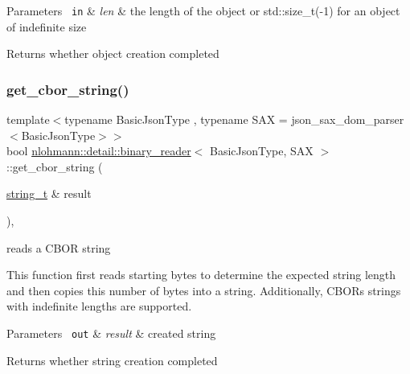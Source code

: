 \begin{DoxyParams}[1]{Parameters}
\mbox{\texttt{ in}}  & {\em len} & the length of the object or std\+::size\+\_\+t(-\/1) for an object of indefinite size \\
\hline
\end{DoxyParams}
\begin{DoxyReturn}{Returns}
whether object creation completed 
\end{DoxyReturn}
\mbox{\label{classnlohmann_1_1detail_1_1binary__reader_acca76844160000e1d8215cb5c7afbba1}} 
\subsubsection{\texorpdfstring{get\_cbor\_string()}{get\_cbor\_string()}}
{\footnotesize\ttfamily template$<$typename Basic\+Json\+Type , typename S\+AX  = json\+\_\+sax\+\_\+dom\+\_\+parser$<$\+Basic\+Json\+Type$>$$>$ \\
bool \mbox{\hyperlink{classnlohmann_1_1detail_1_1binary__reader}{nlohmann\+::detail\+::binary\+\_\+reader}}$<$ Basic\+Json\+Type, S\+AX $>$\+::get\+\_\+cbor\+\_\+string (\begin{DoxyParamCaption}\item[{\mbox{\hyperlink{classnlohmann_1_1detail_1_1binary__reader_aa0b9729917ca7ee6ed01e3792341316e}{string\+\_\+t}} \&}]{result }\end{DoxyParamCaption})\hspace{0.3cm}{\ttfamily [inline]}, {\ttfamily [private]}}



reads a C\+B\+OR string 

This function first reads starting bytes to determine the expected string length and then copies this number of bytes into a string. Additionally, C\+B\+OR\textquotesingle{}s strings with indefinite lengths are supported.


\begin{DoxyParams}[1]{Parameters}
\mbox{\texttt{ out}}  & {\em result} & created string\\
\hline
\end{DoxyParams}
\begin{DoxyReturn}{Returns}
whether string creation completed 
\end{DoxyReturn}
\mbox{\label{classnlohmann_1_1detail_1_1binary__reader_a11a145292c1cc44656c34a6aef38759c}} 
